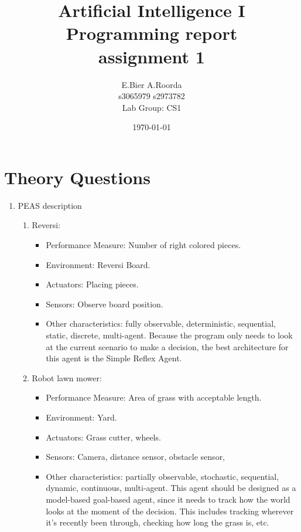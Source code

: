 \documentclass[a4paper]{article}
\begin{document}
\title{Artificial Intelligence I\\
Programming report \\
assignment 1 
}

\date{\today}

\author{E.Bier \quad A.Roorda\\
s3065979 \quad s2973782\\
Lab Group: CS1
}

\maketitle

\section{Theory Questions}
\begin{enumerate}
\item PEAS description
\begin{enumerate}
\item Reversi:
\begin{itemize}
\item Performance Measure: Number of right colored pieces.
\item Environment: Reversi Board.
\item Actuators: Placing pieces.
\item Sensors: Observe board position.
\item Other characteristics: fully observable, deterministic, sequential, static, discrete, multi-agent. Because the program only needs to look at the current scenario to make a decision, the best architecture for this agent is the Simple Reflex Agent.
\end{itemize}
\item Robot lawn mower:
\begin{itemize}
\item Performance Measure: Area of grass with acceptable length.
\item Environment: Yard.
\item Actuators: Grass cutter, wheels.
\item Sensors: Camera, distance sensor, obstacle sensor,
\item Other characteristics: partially observable, stochastic, sequential, dynamic, continuous, multi-agent. This agent should be designed as a model-based goal-based agent, since it needs to track how the world looks at the moment of the decision. This includes tracking wherever it's recently been through, checking how long the grass is, etc.

\end{itemize}
\end{enumerate}
\end{enumerate}
\end{document}
